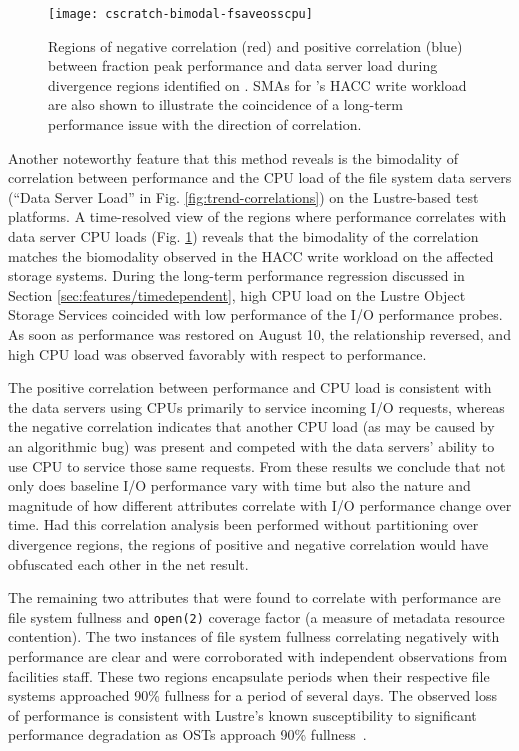 \begin{figure}
    \centering
    \texttt{[image: cscratch-bimodal-fsaveosscpu]}
    \vspace{-.35in}
    \caption{Regions of negative correlation (red) and positive correlation (blue) between fraction peak performance and data server load during divergence regions identified on \cori.
    SMAs for \cori's HACC write workload are also shown to illustrate the coincidence of a long-term performance issue with the direction of correlation.}
    \label{fig:cscratch-bimodal-fsaveosscpu}
    \vspace{-.15in}
\end{figure}

Another noteworthy feature that this method reveals is the bimodality of correlation between performance and the CPU load of the file system data servers (``Data Server Load'' in Fig. \ref{fig:trend-correlations}) on the Lustre-based test platforms.
A time-resolved view of the regions where performance correlates with data server CPU loads (Fig. \ref{fig:cscratch-bimodal-fsaveosscpu}) reveals that the bimodality of the correlation matches the biomodality observed in the HACC write workload on the affected storage systems.
During the long-term performance regression discussed in Section \ref{sec:features/timedependent}, high CPU load on the Lustre Object Storage Services coincided with low performance of the I/O performance probes.
As soon as performance was restored on August 10, the relationship reversed, and high CPU load was observed favorably with respect to performance.

The positive correlation between performance and CPU load is consistent with the data servers using CPUs primarily to service incoming I/O requests, whereas the negative correlation indicates that another CPU load (as may be caused by an algorithmic bug) was present and competed with the data servers' ability to use CPU to service those same requests.
From these results we conclude that not only does baseline I/O performance vary with time but also the nature and magnitude of how different attributes correlate with I/O performance  change over time.
Had this correlation analysis been performed without partitioning over divergence regions, the regions of positive and negative correlation would have obfuscated each other in the net result.

The remaining two attributes that were found to correlate with performance
are file system fullness and \texttt{open(2)} coverage factor (a
measure of metadata resource contention).  The two instances of file
system fullness correlating negatively with performance are clear
and were corroborated with independent observations from facilities
staff.  These two regions encapsulate periods when their respective
file systems approached 90\% fullness for a period of several days.
The observed loss of performance is consistent with Lustre's known
susceptibility to significant performance degradation as OSTs approach
90\% fullness~\cite{oral2014best,Lockwood2017}.

